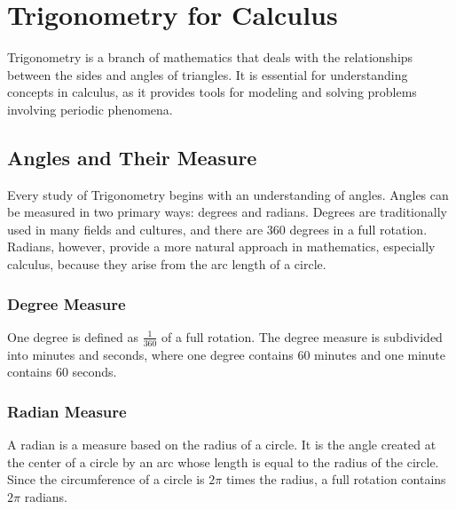 \documentclass[a4paper,12pt]{book}
\begin{document}
\chapter{Trigonometry for Calculus}
\label{chap:trigonometry}

Trigonometry is a branch of mathematics that deals with the relationships between the sides and angles of triangles. It is essential for understanding concepts in calculus, as it provides tools for modeling and solving problems involving periodic phenomena.


\section{Angles and Their Measure}
\label{sec:angles_measure}

Every study of Trigonometry begins with an understanding of angles. Angles can be measured in two primary ways: degrees and radians. Degrees are traditionally used in many fields and cultures, and there are \(360\) degrees in a full rotation. Radians, however, provide a more natural approach in mathematics, especially calculus, because they arise from the arc length of a circle.

\subsection{Degree Measure}
\label{subsec:degree_measure}

One degree is defined as \(\frac{1}{360}\) of a full rotation. The degree measure is subdivided into minutes and seconds, where one degree contains \(60\) minutes and one minute contains \(60\) seconds.

\subsection{Radian Measure}
\label{subsec:radian_measure}

A radian is a measure based on the radius of a circle. It is the angle created at the center of a circle by an arc whose length is equal to the radius of the circle. Since the circumference of a circle is \(2\pi\) times the radius, a full rotation contains \(2\pi\) radians.
\end{document}
